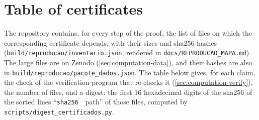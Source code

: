\section{Table of certificates}\label{app:certificates}

The repository contains, for every step of the proof, the list of files on which the corresponding certificate
depends, with their sizes and sha256 hashes (\texttt{build/reproducao/inventario.json}, rendered in
\texttt{docs/REPRODUCAO\_MAPA.md}). The large files are on Zenodo (\cref{sec:computation-data}), and their hashes are
also in \texttt{build/reproducao/pacote\_dados.json}. The table below gives, for each claim, the check of the
verification program that re-checks it (\cref{sec:computation-verify}), the number of files, and a digest: the
first $16$ hexadecimal digits of the sha256 of the sorted lines ``\texttt{sha256}~~path'' of those files, computed by
\texttt{scripts/digest\_certificados.py}.

\begin{table}[ht]
\centering
\small

\caption{Certificates of the proof, by claim. The digest identifies the set of files on which each claim depends.}
\label{tab:digests}
\end{table}
